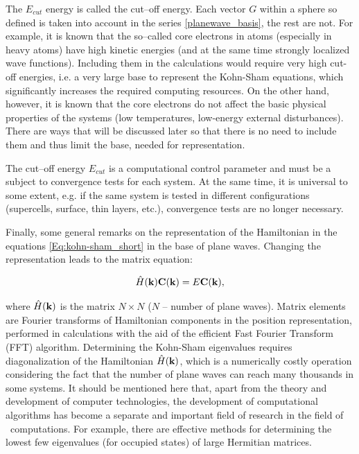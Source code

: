 The $E_{cut}$ energy is called the cut--off energy.
Each vector $G$ within a sphere so defined is taken into account in the series \ref{planewave_basis}, the rest are not.
For example, it is known that the so--called core electrons in atoms (especially in heavy atoms) have high kinetic energies (and at the same time strongly localized wave functions).
Including them in the calculations would require very high cut-off energies, i.e. a very large base to represent the Kohn-Sham equations, which significantly increases the required computing resources.
On the other hand, however, it is known that the core electrons do not affect the basic physical properties of the systems (low temperatures, low-energy external disturbances).
There are ways that will be discussed later so that there is no need to include them and thus limit the base, needed for representation.

The cut--off energy $E_{cut}$ is a computational control parameter and must be a subject to convergence tests for each system.
At the same time, it is universal to some extent, e.g. if the same system is tested in different configurations (supercells, surface, thin layers, etc.), convergence tests are no longer necessary.

Finally, some general remarks on the representation of the Hamiltonian in the equations \ref{Eq:kohn-sham_short} in the base of plane waves.
Changing the representation leads to the matrix equation:

\begin{equation}
    \hat{H}(\mathbf{k})\mathbf{C}(\mathbf{k})=E\mathbf{C}(\mathbf{k}),
    \label{KS_PW}
\end{equation}

where $\hat{H}(\mathbf{k})$ is the matrix $N\times N$ ($N$ -- number of plane waves).
Matrix elements are Fourier transforms of Hamiltonian components in the position representation, performed in calculations with the aid of the efficient Fast Fourier Transform (FFT) algorithm.
Determining the Kohn-Sham eigenvalues requires diagonalization of the Hamiltonian $\hat{H}(\mathbf{k})$, which is a numerically costly operation considering the fact that the number of plane waves can reach many thousands in some systems.
It should be mentioned here that, apart from the theory and development of computer technologies, the development of computational algorithms has become a separate and important field of research in the field of \abinitio\ computations.
For example, there are effective methods for determining the lowest few eigenvalues (for occupied states) of large Hermitian matrices.

